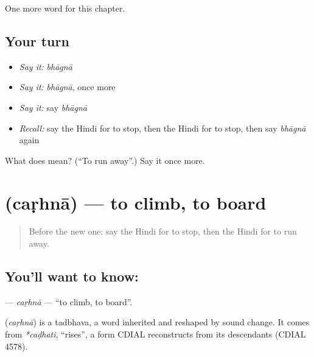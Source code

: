 \begin{grammarlens}[title={What you've built}]
One more word for this chapter.
\end{grammarlens}

\subsection*{Your turn}
\begin{itemize}
\raggedright
  \item \emph{Say it:} \emph{bhāgnā}
  \item \emph{Say it:} \emph{bhāgnā}, once more
  \item \emph{Say it:} say \emph{bhāgnā}
  \item \emph{Recall:} say the Hindi for to stop, then the Hindi for to stop, then say \emph{bhāgnā} again
\end{itemize}

\begin{tcolorbox}[breakable,colback=teal!4,colframe=teal!35!black,title={Before you move on}]
What does  mean? (\textquotedblleft{}To run away\textquotedblright{}.) Say it once more.
\end{tcolorbox}
\section[\texorpdfstring{\hi{चढ़ना} (caṛhnā)}{चढ़ना (caṛhnā)}]{ (caṛhnā) — to climb, to board}

\label{lesson:HI-C172-carhna}



\begin{quote}
Before the new one: say the Hindi for to stop, then the Hindi for to run away.
\end{quote}

\subsection*{You'll want to know: }
\textbf{} — \emph{caṛhnā} — \textquotedblleft{}to climb, to board\textquotedblright{}.

\begin{cousinweb}
\textbf{} (\emph{caṛhnā}) is a tadbhava, a word inherited and reshaped by sound change. It comes from \emph{*caḍhati}, \textquotedblleft{}rises\textquotedblright{}, a form CDIAL reconstructs from its descendants (CDIAL 4578).
\end{cousinweb}

